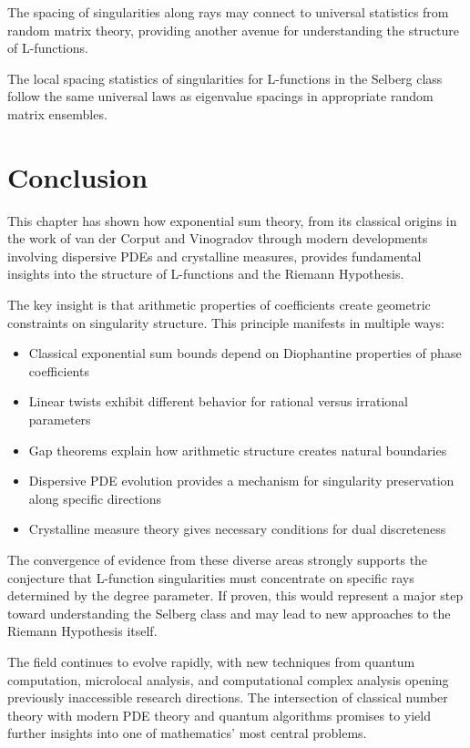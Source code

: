 The spacing of singularities along rays may connect to universal statistics from random matrix theory, providing another avenue for understanding the structure of L-functions.

\begin{conjecture}
The local spacing statistics of singularities for L-functions in the Selberg class follow the same universal laws as eigenvalue spacings in appropriate random matrix ensembles.
\end{conjecture}

\section{Conclusion}
\label{sec:conclusion}

This chapter has shown how exponential sum theory, from its classical origins in the work of van der Corput and Vinogradov through modern developments involving dispersive PDEs and crystalline measures, provides fundamental insights into the structure of L-functions and the Riemann Hypothesis.

The key insight is that arithmetic properties of coefficients create geometric constraints on singularity structure. This principle manifests in multiple ways:

\begin{itemize}
\item Classical exponential sum bounds depend on Diophantine properties of phase coefficients
\item Linear twists exhibit different behavior for rational versus irrational parameters
\item Gap theorems explain how arithmetic structure creates natural boundaries
\item Dispersive PDE evolution provides a mechanism for singularity preservation along specific directions
\item Crystalline measure theory gives necessary conditions for dual discreteness
\end{itemize}

The convergence of evidence from these diverse areas strongly supports the conjecture that L-function singularities must concentrate on specific rays determined by the degree parameter. If proven, this would represent a major step toward understanding the Selberg class and may lead to new approaches to the Riemann Hypothesis itself.

The field continues to evolve rapidly, with new techniques from quantum computation, microlocal analysis, and computational complex analysis opening previously inaccessible research directions. The intersection of classical number theory with modern PDE theory and quantum algorithms promises to yield further insights into one of mathematics' most central problems.